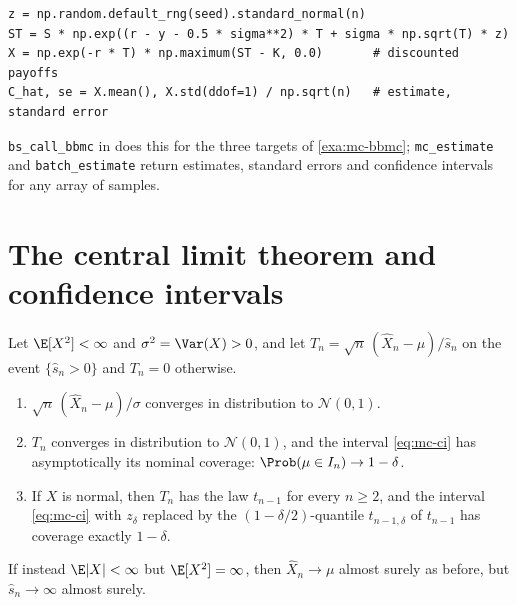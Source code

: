 \begin{incode}
\begin{lstlisting}
z = np.random.default_rng(seed).standard_normal(n)
ST = S * np.exp((r - y - 0.5 * sigma**2) * T + sigma * np.sqrt(T) * z)
X = np.exp(-r * T) * np.maximum(ST - K, 0.0)       # discounted payoffs
C_hat, se = X.mean(), X.std(ddof=1) / np.sqrt(n)   # estimate, standard error
\end{lstlisting}
\texttt{bs\_call\_bbmc} in  does this for the three
targets of \cref{exa:mc-bbmc}; \texttt{mc\_estimate} and \texttt{batch\_estimate} return
estimates, standard errors and confidence intervals for any array of samples.
\end{incode}

\section{The central limit theorem and confidence intervals}\label{sec:mc-clt}

\begin{theorem}\label{thm:mc-clt}
Let $\E[X^2]<\infty$ and $\sigma^2=\Var(X)>0$, and let $T_n=\sqrt n\,(\hat X_n-\mu)/\hat s_n$
on the event $\{\hat s_n>0\}$ and $T_n=0$ otherwise.
\begin{enumerate}[label=(\roman*)]
  \item $\sqrt n\,(\hat X_n-\mu)/\sigma$ converges in distribution to $\mathcal N(0,1)$.
  \item $T_n$ converges in distribution to $\mathcal N(0,1)$, and the interval
    \eqref{eq:mc-ci} has asymptotically its nominal coverage: $\Prob(\mu\in I_n)\to1-\delta$.
  \item If $X$ is normal, then $T_n$ has the law $t_{n-1}$ for every $n\ge2$, and the
    interval \eqref{eq:mc-ci} with $z_\delta$ replaced by the $(1-\delta/2)$-quantile
    $t_{n-1,\delta}$ of $t_{n-1}$ has coverage exactly $1-\delta$.
\end{enumerate}
If instead $\E|X|<\infty$ but $\E[X^2]=\infty$, then $\hat X_n\to\mu$ almost surely as
before, but $\hat s_n\to\infty$ almost surely.
\end{theorem}

